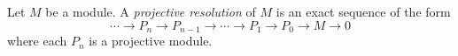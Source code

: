 \documentclass[12pt]{article}
\begin{document}
Let $M$ be a module.  A {\it projective resolution} of $M$
is an exact sequence of the form
$$\cdots \to P_n \to P_{n-1} \to \cdots \to P_1 \to P_0 \to M \to 0$$
where each $P_n$ is a projective module.
\end{document}
